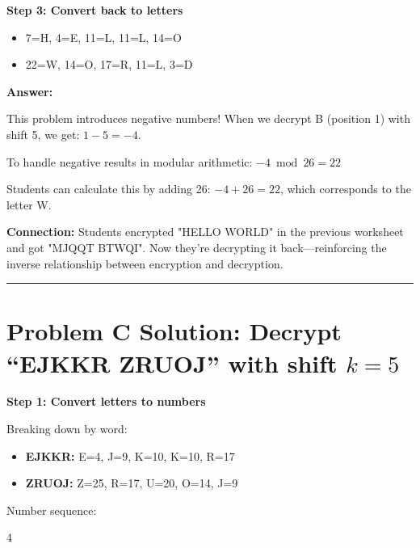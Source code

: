 \documentclass[12pt]{article}
\begin{document}
\vspace{0.3cm}

\textbf{Step 3: Convert back to letters}

\begin{itemize}[leftmargin=*]
\item 7=H, 4=E, 11=L, 11=L, 14=O
\item 22=W, 14=O, 17=R, 11=L, 3=D
\end{itemize}

\vspace{0.3cm}
\noindent\textbf{Answer:} 

\vspace{0.5cm}

\begin{tcolorbox}[colback=yellow!10!white,colframe=orange!50!black,title=\textbf{Teaching Note}]
This problem introduces negative numbers! When we decrypt B (position 1) with shift 5, we get: $1 - 5 = -4$.

To handle negative results in modular arithmetic: $-4 \bmod 26 = 22$

Students can calculate this by adding 26: $-4 + 26 = 22$, which corresponds to the letter W.

\textbf{Connection:} Students encrypted "HELLO WORLD" in the previous worksheet and got "MJQQT BTWQI". Now they're decrypting it back—reinforcing the inverse relationship between encryption and decryption.
\end{tcolorbox}

\vspace{0.8cm}
\hrule
\vspace{0.8cm}

\section*{Problem C Solution: Decrypt ``EJKKR ZRUOJ'' with shift $k=5$}

\textbf{Step 1: Convert letters to numbers}

Breaking down by word:
\begin{itemize}[leftmargin=*]
\item \textbf{EJKKR:} E=4, J=9, K=10, K=10, R=17
\item \textbf{ZRUOJ:} Z=25, R=17, U=20, O=14, J=9
\end{itemize}

Number sequence: 
\begin{center}
4         
\end{center}
\end{document}
